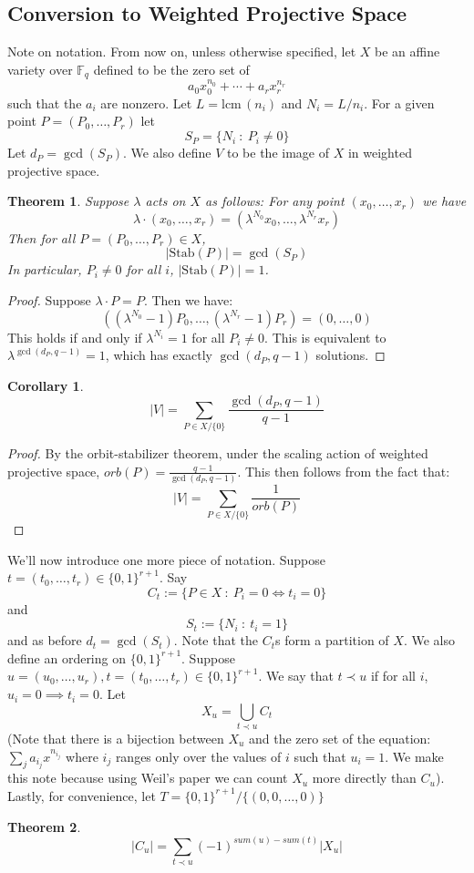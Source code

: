 \documentclass{article}
\newcommand{\F}{\mathbb{F}}
\newcommand{\Stab}[0]{\mathrm{Stab}}
\newcommand{\lcm}[0]{\mathrm{lcm} \,}
\newtheorem{theorem}{Theorem}[section]
\newtheorem{corollary}{Corollary}[theorem]
\theoremstyle{definition}
\theoremstyle{definition}
\theoremstyle{remark}
\begin{document}
\subsection{Conversion to Weighted Projective Space}
Note on notation. From now on, unless otherwise specified, let $X$ be an affine variety over $\F_q$ defined to be the zero set of
\[a_0x_0^{n_0} + \cdots + a_rx_r^{n_r}\]
such that the $a_i$ are nonzero. Let $L = \lcm(n_i)$ and $N_i = L/n_i$. For a given point $P = (P_0, \ldots, P_r)$ let 
\[S_P = \{ N_i \ : \ P_i \neq 0\}\]
Let $d_P = \gcd(S_P)$. We also define $V$ to be the image of $X$ in weighted projective space.
\begin{theorem} Suppose $\lambda$ acts on $X$ as follows: For any point $(x_0, \ldots, x_r)$ we have
\[\lambda \cdot (x_0, \ldots, x_r) = (\lambda^{N_0}x_0, \ldots, \lambda^{N_r}x_r)\]
Then for all $P = (P_0,\ldots, P_r) \in X$, 
\[|\Stab(P)| = \gcd(S_P)\]
In particular, $P_i \neq 0$ for all $i$, $|\Stab(P)| = 1$.
\end{theorem}
\begin{proof}
Suppose $\lambda\cdot P = P$. Then we have:
\[((\lambda^{N_0}-1)P_0, \ldots, (\lambda^{N_r}-1)P_r) = (0, \ldots, 0)\]
This holds if and only if $\lambda^{N_i} = 1$ for all $P_i \neq 0$. This is equivalent to $\lambda^{\gcd(d_P, q - 1)} = 1$, which has exactly $\gcd(d_P, q - 1)$ solutions.
\end{proof}
\begin{corollary}
\label{cor:orbit_count_V}
\[|V| = \sum_{P \in X/\{0\}} \frac{\gcd(d_P, q - 1)}{q - 1}\]
\end{corollary}
\begin{proof}
By the orbit-stabilizer theorem, under the scaling action of weighted projective space, $orb(P) = \frac{q-1}{\gcd(d_P, q-1)}$. This then follows from the fact that:
\[|V| = \sum_{P \in X/\{0\}} \frac{1}{orb(P)}\]
\end{proof}
We'll now introduce one more piece of notation. Suppose $t = (t_0, \ldots, t_r) \in \{0,1\}^{r+1}$. Say
\[C_t := \{P \in X \ : \ P_i = 0 \iff t_i = 0\}\]
and
\[S_t := \{N_i \ : \ t_i = 1\}\]
and as before $d_t = \gcd(S_t)$. Note that the $C_t$s form a partition of $X$. We also define an ordering on $\{0,1\}^{r+1}$. Suppose $u = (u_0,\ldots, u_r),t = (t_0, \ldots, t_r) \in \{0,1\}^{r+1}$. We say that $t \prec u$ if for all $i$, $u_i = 0 \implies t_i = 0$. Let
\[X_u = \bigcup_{t \prec u} C_t\]
(Note that there is a bijection between $X_u$ and the zero set of the equation: $\sum_j a_{i_j}x^{n_{i_j}}$ where $i_j$ ranges only over the values of $i$ such that $u_i = 1$. We make this note because using Weil's paper we can count $X_u$ more directly than $C_u$). Lastly, for convenience, let $T = \{0,1\}^{r+1}/\{(0,0,\ldots, 0)\}$
\begin{theorem}
\[|C_u| = \sum_{t \prec u} (-1)^{sum(u) - sum(t)} |X_u|\]
\end{theorem}
\end{document}
